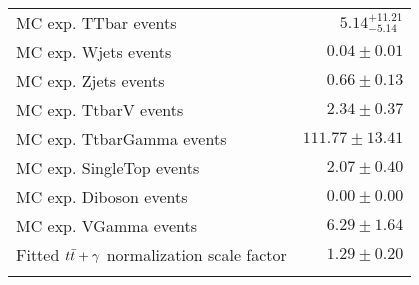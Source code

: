 \begin{table}[!h]
\begin{center}
{\begin{tabular*}{\textwidth}{@{\extracolsep{\fill}}lr}
        MC exp. TTbar events         & $5.14_{-5.14}^{+11.21}$              \\
        MC exp. Wjets events         & $0.04 \pm 0.01$              \\
        MC exp. Zjets events         & $0.66 \pm 0.13$              \\
        MC exp. TtbarV events         & $2.34 \pm 0.37$              \\
        MC exp. TtbarGamma events         & $111.77 \pm 13.41$              \\
        MC exp. SingleTop events         & $2.07 \pm 0.40$              \\
        MC exp. Diboson events         & $0.00 \pm 0.00$              \\
        MC exp. VGamma events         & $6.29 \pm 1.64$              \\
\noalign{\smallskip}\hline\noalign{\smallskip}
Fitted $t\bar{t}+\gamma$ normalization scale factor & $1.29 \pm 0.20$ \\
\noalign{\smallskip}\hline\noalign{\smallskip}
\end{tabular*}
}
\end{center}
\end{table}
%